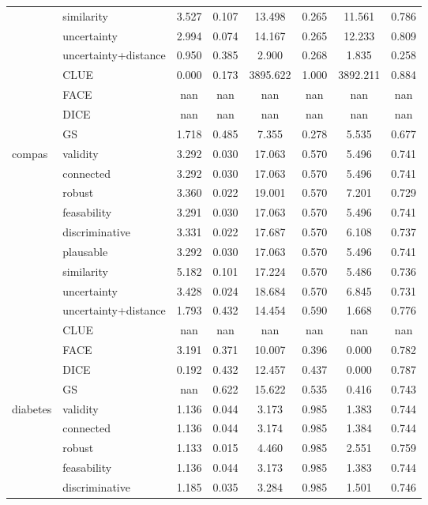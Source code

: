 \begin{table}[ht]
\begin{tabular}{l l c c c c c c}
 & similarity & 3.527 & 0.107 & 13.498 & 0.265 & 11.561 & 0.786 \\ 
 & uncertainty & 2.994 & 0.074 & 14.167 & 0.265 & 12.233 & 0.809 \\ 
 & uncertainty+distance & 0.950 & 0.385 & 2.900 & 0.268 & 1.835 & 0.258 \\ 
 & CLUE & 0.000 & 0.173 & 3895.622 & 1.000 & 3892.211 & 0.884 \\ 
 & FACE & nan & nan & nan & nan & nan & nan \\ 
 & DICE & nan & nan & nan & nan & nan & nan \\ 
 & GS & 1.718 & 0.485 & 7.355 & 0.278 & 5.535 & 0.677 \\ 
\hline
\multirow{13}{*}{compas} & validity & 3.292 & 0.030 & 17.063 & 0.570 & 5.496 & 0.741 \\ 
 & connected & 3.292 & 0.030 & 17.063 & 0.570 & 5.496 & 0.741 \\ 
 & robust & 3.360 & 0.022 & 19.001 & 0.570 & 7.201 & 0.729 \\ 
 & feasability & 3.291 & 0.030 & 17.063 & 0.570 & 5.496 & 0.741 \\ 
 & discriminative & 3.331 & 0.022 & 17.687 & 0.570 & 6.108 & 0.737 \\ 
 & plausable & 3.292 & 0.030 & 17.063 & 0.570 & 5.496 & 0.741 \\ 
 & similarity & 5.182 & 0.101 & 17.224 & 0.570 & 5.486 & 0.736 \\ 
 & uncertainty & 3.428 & 0.024 & 18.684 & 0.570 & 6.845 & 0.731 \\ 
 & uncertainty+distance & 1.793 & 0.432 & 14.454 & 0.590 & 1.668 & 0.776 \\ 
 & CLUE & nan & nan & nan & nan & nan & nan \\ 
 & FACE & 3.191 & 0.371 & 10.007 & 0.396 & 0.000 & 0.782 \\ 
 & DICE & 0.192 & 0.432 & 12.457 & 0.437 & 0.000 & 0.787 \\ 
 & GS & nan & 0.622 & 15.622 & 0.535 & 0.416 & 0.743 \\ 
\hline
\multirow{13}{*}{diabetes} & validity & 1.136 & 0.044 & 3.173 & 0.985 & 1.383 & 0.744 \\ 
 & connected & 1.136 & 0.044 & 3.174 & 0.985 & 1.384 & 0.744 \\ 
 & robust & 1.133 & 0.015 & 4.460 & 0.985 & 2.551 & 0.759 \\ 
 & feasability & 1.136 & 0.044 & 3.173 & 0.985 & 1.383 & 0.744 \\ 
 & discriminative & 1.185 & 0.035 & 3.284 & 0.985 & 1.501 & 0.746 \\ 

\end{tabular}
\end{table}
